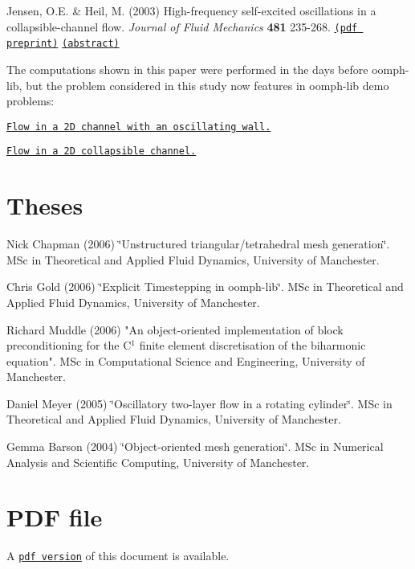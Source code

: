 \begin{DoxyItemize}
\item Jensen, O.\-E. \& Heil, M. (2003) High-\/frequency self-\/excited oscillations in a collapsible-\/channel flow. {\itshape Journal of Fluid Mechanics} {\bfseries 481} 235-\/268. \href{http://www.maths.man.ac.uk/~mheil/MATTHIAS/PDF/JensenHeil2003.pdf}{\tt (pdf preprint)} \href{http://www.maths.man.ac.uk/~mheil/MATTHIAS/ABSTRACTS/JensenHeil02.html}{\tt (abstract)} \par
\par
 The computations shown in this paper were performed in the days before {\ttfamily oomph-\/lib}, but the problem considered in this study now features in oomph-\/lib demo problems\-: \par
\par

\begin{DoxyItemize}
\item \href{../../navier_stokes/collapsible_channel/html/index.html}{\tt Flow in a 2\-D channel with an oscillating wall.} \par
\par

\item \href{../../interaction/fsi_collapsible_channel/html/index.html}{\tt Flow in a 2\-D collapsible channel.}
\end{DoxyItemize}
\end{DoxyItemize}

 

\hypertarget{index_theses}{}\section{Theses}\label{index_theses}

\begin{DoxyItemize}
\item Nick Chapman (2006) \char`\"{}\-Unstructured triangular/tetrahedral mesh
  generation\char`\"{}. M\-Sc in Theoretical and Applied Fluid Dynamics, University of Manchester.
\item Chris Gold (2006) \char`\"{}\-Explicit Timestepping in oomph-\/lib\char`\"{}. M\-Sc in Theoretical and Applied Fluid Dynamics, University of Manchester.
\item Richard Muddle (2006) "An object-\/oriented implementation of block preconditioning for the C$^{\mbox{1}}$  finite element discretisation of the biharmonic equation". M\-Sc in Computational Science and Engineering, University of Manchester.
\item Daniel Meyer (2005) \char`\"{}\-Oscillatory two-\/layer flow in a rotating
  cylinder\char`\"{}. M\-Sc in Theoretical and Applied Fluid Dynamics, University of Manchester.
\item Gemma Barson (2004) \char`\"{}\-Object-\/oriented mesh generation\char`\"{}. M\-Sc in Numerical Analysis and Scientific Computing, University of Manchester.
\end{DoxyItemize}



 

 \hypertarget{index_pdf}{}\section{P\-D\-F file}\label{index_pdf}
A \href{../latex/refman.pdf}{\tt pdf version} of this document is available. 